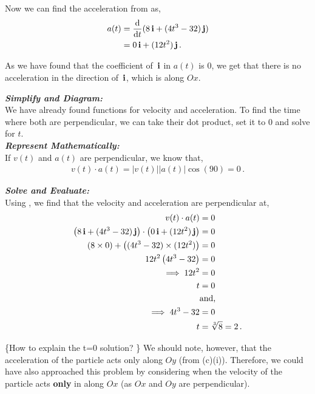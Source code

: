 \begin{subquestions}
\begin{subsubquestions}
Now we can find the acceleration from  as,
\begin{align}
	a(t) & = \frac{\mathrm{d}}{\mathrm{d}t}(8\,\mathbf{i}+(4t^3-32)\,\mathbf{j}) \nonumber \\
	     & = 0\,\mathbf{i} + (12t^2)\,\mathbf{j} \,.
\end{align}

As we have found that the coefficient of $\,\mathbf{i}$ in $a(t)$ is 0, we get that there is no acceleration in the direction of $\,\mathbf{i}$, which is along $Ox$. 


\subsubquestion

\textbf{\textit{Simplify and Diagram:}} \\
We have already found functions for velocity and acceleration. To find the time where both are perpendicular, we can take their dot product, set it to 0 and solve for $t$. \\



\textbf{\textit{Represent Mathematically:}} \\
If $v(t)$ and $a(t)$ are perpendicular, we know that,
\begin{align}
	v(t) \cdot a(t) = |v(t)||a(t)|\cos(90) = 0 \label{2009:q6:DotEqn} \,.
\end{align}




\textbf{\textit{Solve and Evaluate:}} \\
Using , we find that the velocity and acceleration are perpendicular at,
\begin{align}
	v(t) \cdot a(t) & = 0 \nonumber \\
	\left(8\,\mathbf{i} + (4t^3-32)\,\mathbf{j}\right) \cdot \left(0\,\mathbf{i} + (12t^2)\,\mathbf{j} \right) & = 0 \nonumber \\
	\left(8 \times 0\right) + \left((4t^3-32) \times (12t^2)\right) & = 0 \nonumber \\
	12t^2\left(4t^3-32\right) & = 0 \nonumber \\
	\implies 12t^2 & = 0 \nonumber \\
	t & = 0 \\
	& \text{and,} \nonumber \\
	\implies 4t^3-32 & = 0 \nonumber \\
	t & = \sqrt[3]{8} = 2 \,.
\end{align}

\{How to explain the t=0 solution? \}
We should note, however, that the acceleration of the particle acts only along $Oy$ (from (c)(i)). Therefore, we could have also approached this problem by considering when the velocity of the particle acts \textbf{only} in along $Ox$ (as $Ox$ and $Oy$ are perpendicular).


\end{subsubquestions}
\end{subquestions}
